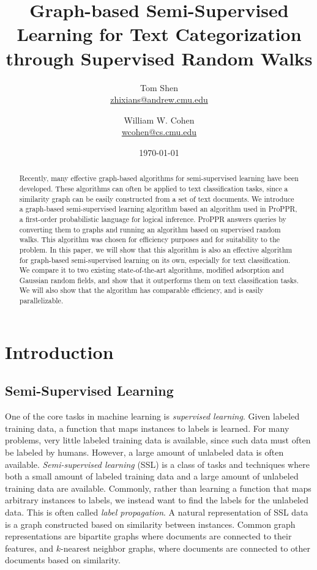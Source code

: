 \documentclass[12pt]{article}
\title{Graph-based Semi-Supervised Learning for Text Categorization through Supervised Random Walks}
\author{
    Tom Shen \\
    \href{mailto:zhixians@andrew.cmu.edu}{zhixians@andrew.cmu.edu}
    \and
    William W. Cohen \\
    \href{mailto:wcohen@cs.cmu.edu}{wcohen@cs.cmu.edu}
}
\date{\today}
\begin{document}


\maketitle
\pagebreak

\singlespacing
\tableofcontents
\pagebreak

\doublespacing
{}

\begin{abstract}
Recently, many effective graph-based algorithms for semi-supervised learning have been developed.
These algorithms can often be applied to text classification tasks, since a similarity graph can be easily constructed from a set of text documents.
We introduce a graph-based semi-supervised learning algorithm based an algorithm used in ProPPR, a first-order probabilistic language for logical inference.
ProPPR answers queries by converting them to graphs and running an algorithm based on supervised random walks.
This algorithm was chosen for efficiency purposes and for suitability to the problem.
In this paper, we will show that this algorithm is also an effective algorithm for graph-based semi-supervised learning on its own, especially for text classification.
We compare it to two existing state-of-the-art algorithms, modified adsorption and Gaussian random fields, and show that it outperforms them on text classification tasks.
We will also show that the algorithm has comparable efficiency, and is easily parallelizable.
\end{abstract}
\pagebreak


\section{Introduction}

\subsection{Semi-Supervised Learning}
One of the core tasks in machine learning is \textit{supervised learning}.
Given labeled training data, a function that maps instances to labels is learned.
For many problems, very little labeled training data is available, since such data must often be labeled by humans.
However, a large amount of unlabeled data is often available.
\textit{Semi-supervised learning} (SSL) is a class of tasks and techniques where both a small amount of labeled training data and a large amount of unlabeled training data are available.
Commonly, rather than learning a function that maps arbitrary instances to labels, we instead want to find the labels for the unlabeled data. This is often called \textit{label propagation}.
A natural representation of SSL data is a graph constructed based on similarity between instances.
Common graph representations are bipartite graphs where documents are connected to their features, and $k$-nearest neighbor graphs, where documents are connected to other documents based on similarity.
\end{document}
